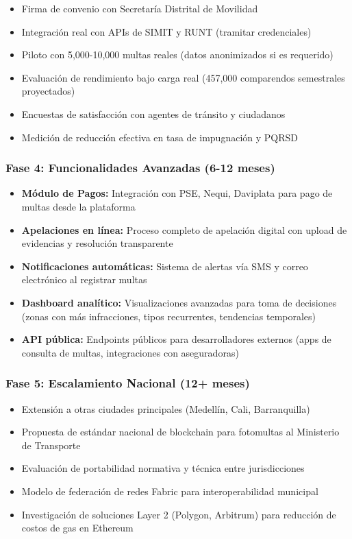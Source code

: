 \begin{itemize}
    \item Firma de convenio con Secretaría Distrital de Movilidad
    \item Integración real con APIs de SIMIT y RUNT (tramitar credenciales)
    \item Piloto con 5,000-10,000 multas reales (datos anonimizados si es requerido)
    \item Evaluación de rendimiento bajo carga real (457,000 comparendos semestrales proyectados)
    \item Encuestas de satisfacción con agentes de tránsito y ciudadanos
    \item Medición de reducción efectiva en tasa de impugnación y PQRSD
\end{itemize}

\subsubsection{Fase 4: Funcionalidades Avanzadas (6-12 meses)}

\begin{itemize}
    \item \textbf{Módulo de Pagos:} Integración con PSE, Nequi, Daviplata para pago de multas desde la plataforma
    \item \textbf{Apelaciones en línea:} Proceso completo de apelación digital con upload de evidencias y resolución transparente
    \item \textbf{Notificaciones automáticas:} Sistema de alertas vía SMS y correo electrónico al registrar multas
    \item \textbf{Dashboard analítico:} Visualizaciones avanzadas para toma de decisiones (zonas con más infracciones, tipos recurrentes, tendencias temporales)
    \item \textbf{API pública:} Endpoints públicos para desarrolladores externos (apps de consulta de multas, integraciones con aseguradoras)
\end{itemize}

\subsubsection{Fase 5: Escalamiento Nacional (12+ meses)}

\begin{itemize}
    \item Extensión a otras ciudades principales (Medellín, Cali, Barranquilla)
    \item Propuesta de estándar nacional de blockchain para fotomultas al Ministerio de Transporte
    \item Evaluación de portabilidad normativa y técnica entre jurisdicciones
    \item Modelo de federación de redes Fabric para interoperabilidad municipal
    \item Investigación de soluciones Layer 2 (Polygon, Arbitrum) para reducción de costos de gas en Ethereum
\end{itemize}

